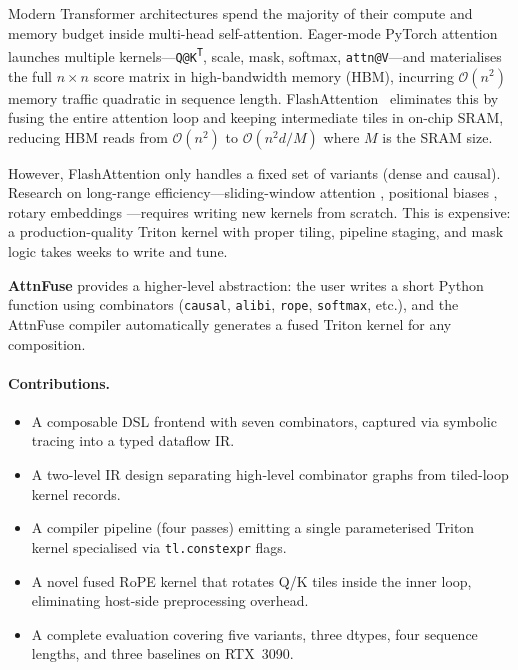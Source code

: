 \documentclass[10pt,twocolumn]{article}
\begin{document}
Modern Transformer architectures spend the majority of their compute and
memory budget inside multi-head self-attention.  Eager-mode PyTorch attention
launches multiple kernels---\texttt{Q@K\textsuperscript{T}}, scale, mask,
softmax, \texttt{attn@V}---and materialises the full $n \times n$ score
matrix in high-bandwidth memory (HBM), incurring $\mathcal{O}(n^2)$ memory
traffic quadratic in sequence length.  FlashAttention~\cite{dao2022flashattention,dao2023flashattention2}
eliminates this by fusing the entire attention loop and keeping
intermediate tiles in on-chip SRAM, reducing HBM reads from
$\mathcal{O}(n^2)$ to $\mathcal{O}(n^2 d / M)$ where $M$ is the SRAM size.

However, FlashAttention only handles a fixed set of variants (dense and
causal).  Research on long-range efficiency---sliding-window attention
\cite{child2019generating}, positional biases \cite{press2021alibi},
rotary embeddings \cite{su2021roformer}---requires writing new kernels
from scratch.  This is expensive: a production-quality Triton kernel with
proper tiling, pipeline staging, and mask logic takes weeks to write and tune.

\textbf{AttnFuse} provides a higher-level abstraction: the user writes a
short Python function using combinators (\texttt{causal}, \texttt{alibi},
\texttt{rope}, \texttt{softmax}, etc.), and the AttnFuse compiler
automatically generates a fused Triton kernel for any composition.

\paragraph{Contributions.}
\begin{itemize}[leftmargin=1.2em,itemsep=1pt]
  \item A composable DSL frontend with seven combinators, captured via
        symbolic tracing into a typed dataflow IR.
  \item A two-level IR design separating high-level combinator graphs from
        tiled-loop kernel records.
  \item A compiler pipeline (four passes) emitting a single parameterised
        Triton kernel specialised via \texttt{tl.constexpr} flags.
  \item A novel fused RoPE kernel that rotates Q/K tiles inside the inner
        loop, eliminating host-side preprocessing overhead.
  \item A complete evaluation covering five variants, three dtypes, four
        sequence lengths, and three baselines on RTX~3090.
\end{itemize}
\end{document}
